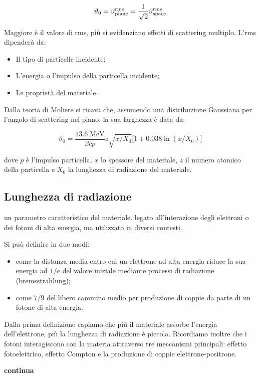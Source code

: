 $$\vartheta_0=\vartheta_{\rm plane}^{\rm rms}
=\frac{1}{\sqrt{2}} \vartheta_{\rm space}^{\rm rms}$$

Maggiore è il valore di rms, più si evidenziano effetti di scattering multiplo. L'rms dipenderà da:

\begin{itemize}
    \item Il tipo di particelle incidente;
    \item L'energia o l'impulso della particella incidente;
    \item Le proprietà del materiale.
\end{itemize}

Dalla teoria di Moliere si ricava che, assumendo una distribuzione Gaussiana per l'angolo di scattering nel piano, la sua larghezza è data da:

$$\vartheta_0=\frac{13.6 \; \text{MeV}}{\beta c p} z \sqrt{x/X_0} \big[ 1 + 0.038 \ln(x/X_0) \big]$$

dove $p$ è l'impulso particella, $x$ lo spessore del materiale, $z$ il numero atomico della particella e $X_0$ la lunghezza di radiazione del materiale.

\subsection{Lunghezza di radiazione}

\E un parametro caratteristico del materiale. \E legato all'interazione degli elettroni o dei fotoni di alta energia, ma utilizzato in diversi contesti.

Si può definire in due modi:

\begin{itemize}
    \item come la distanza media entro cui un elettrone ad alta energia riduce la sua energia ad $1/e$ del valore iniziale mediante processi di radiazione (bremsstrahlung);
    \item come $7/9$ del libero cammino medio per produzione di coppie da parte di un fotone di alta energia.
\end{itemize}

Dalla prima definizione capiamo che più il materiale assorbe l'energia dell'elettrone, più la lunghezza di radiazione è piccola. Ricordiamo inoltre che i fotoni interagiscono con la materia attraverso tre meccanismi principali: effetto fotoelettrico, effetto Compton e la produzione di coppie elettrone-positrone.

\textbf{continua}

